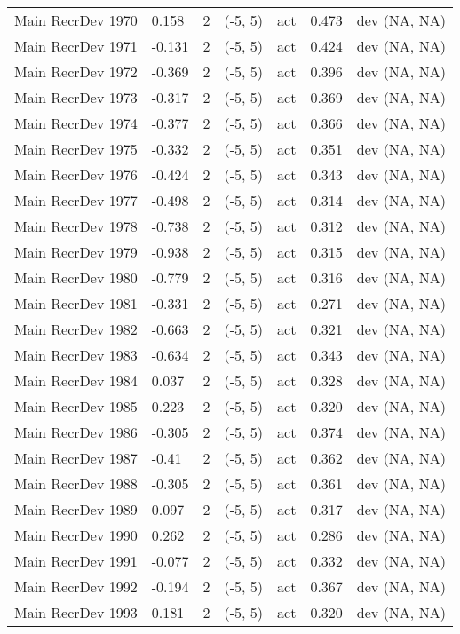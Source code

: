 \documentclass[11pt,
  letterpaper,
]{article}
\begin{document}
\begin{landscape}
\begin{longtable}[t]{>{\raggedright\arraybackslash}p{7.5cm}lllll>{\raggedright\arraybackslash}p{3.5cm}}
Main RecrDev 1970 & 0.158 & 2 & (-5, 5) & act & 0.473 & dev (NA, NA)\\
Main RecrDev 1971 & -0.131 & 2 & (-5, 5) & act & 0.424 & dev (NA, NA)\\
Main RecrDev 1972 & -0.369 & 2 & (-5, 5) & act & 0.396 & dev (NA, NA)\\
Main RecrDev 1973 & -0.317 & 2 & (-5, 5) & act & 0.369 & dev (NA, NA)\\
Main RecrDev 1974 & -0.377 & 2 & (-5, 5) & act & 0.366 & dev (NA, NA)\\
Main RecrDev 1975 & -0.332 & 2 & (-5, 5) & act & 0.351 & dev (NA, NA)\\
Main RecrDev 1976 & -0.424 & 2 & (-5, 5) & act & 0.343 & dev (NA, NA)\\
Main RecrDev 1977 & -0.498 & 2 & (-5, 5) & act & 0.314 & dev (NA, NA)\\
Main RecrDev 1978 & -0.738 & 2 & (-5, 5) & act & 0.312 & dev (NA, NA)\\
Main RecrDev 1979 & -0.938 & 2 & (-5, 5) & act & 0.315 & dev (NA, NA)\\
Main RecrDev 1980 & -0.779 & 2 & (-5, 5) & act & 0.316 & dev (NA, NA)\\
Main RecrDev 1981 & -0.331 & 2 & (-5, 5) & act & 0.271 & dev (NA, NA)\\
Main RecrDev 1982 & -0.663 & 2 & (-5, 5) & act & 0.321 & dev (NA, NA)\\
Main RecrDev 1983 & -0.634 & 2 & (-5, 5) & act & 0.343 & dev (NA, NA)\\
Main RecrDev 1984 & 0.037 & 2 & (-5, 5) & act & 0.328 & dev (NA, NA)\\
Main RecrDev 1985 & 0.223 & 2 & (-5, 5) & act & 0.320 & dev (NA, NA)\\
Main RecrDev 1986 & -0.305 & 2 & (-5, 5) & act & 0.374 & dev (NA, NA)\\
Main RecrDev 1987 & -0.41 & 2 & (-5, 5) & act & 0.362 & dev (NA, NA)\\
Main RecrDev 1988 & -0.305 & 2 & (-5, 5) & act & 0.361 & dev (NA, NA)\\
Main RecrDev 1989 & 0.097 & 2 & (-5, 5) & act & 0.317 & dev (NA, NA)\\
Main RecrDev 1990 & 0.262 & 2 & (-5, 5) & act & 0.286 & dev (NA, NA)\\
Main RecrDev 1991 & -0.077 & 2 & (-5, 5) & act & 0.332 & dev (NA, NA)\\
Main RecrDev 1992 & -0.194 & 2 & (-5, 5) & act & 0.367 & dev (NA, NA)\\
Main RecrDev 1993 & 0.181 & 2 & (-5, 5) & act & 0.320 & dev (NA, NA)\\

\end{longtable}
\end{landscape}
\end{document}
